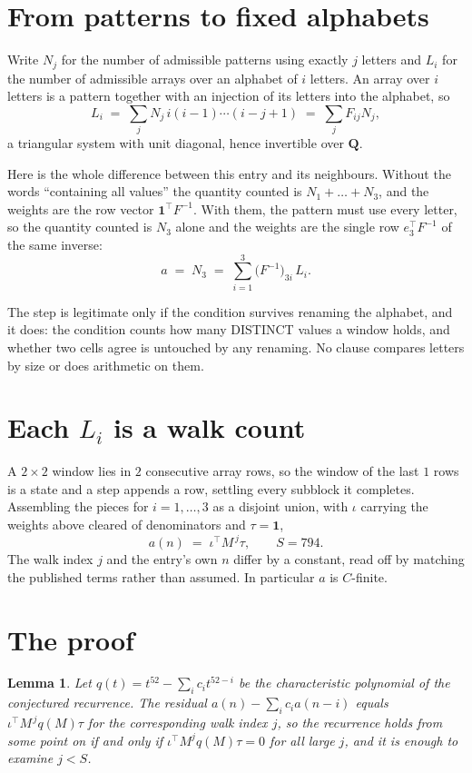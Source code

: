 \documentclass[11pt,a4paper]{article}
\theoremstyle{plain}
\newtheorem{lemma}[theorem]{Lemma}
\theoremstyle{definition}
\begin{document}
\section{From patterns to fixed alphabets}

Write $N_j$ for the number of admissible patterns using exactly $j$ letters and $L_i$ for the
number of admissible arrays over an alphabet of $i$ letters. An array over $i$ letters is a
pattern together with an injection of its letters into the alphabet, so
\[
L_i\;=\;\sum_{j} N_j\,i(i-1)\cdots(i-j+1)\;=\;\sum_j F_{ij}N_j ,
\]
a triangular system with unit diagonal, hence invertible over $\mathbf{Q}$.

Here is the whole difference between this entry and its neighbours. Without the words
``containing all values'' the quantity counted is $N_1+\dots+N_{3}$, and the weights are
the row vector $\mathbf{1}^{\!\top}F^{-1}$. With them, the pattern must use every letter,
so the quantity counted is $N_{3}$ alone and the weights are the single row
$e_{3}^{\!\top}F^{-1}$ of the same inverse:
\[
a\;=\;N_{3}\;=\;\sum_{i=1}^{3}\bigl(F^{-1}\bigr)_{3i}\,L_i .
\]

The step is legitimate only if the condition survives renaming the alphabet, and it does: the
condition counts how many DISTINCT values a window holds, and whether two cells agree is
untouched by any renaming. No clause compares letters by size or does arithmetic on them.

\section{Each $L_i$ is a walk count}

A $2\times2$ window lies in $2$ consecutive array rows, so the window of the last
$1$ rows is a state and a step appends a row, settling every subblock it completes.
Assembling the pieces for $i=1,\dots,3$ as a disjoint union, with $\iota$ carrying the
weights above cleared of denominators and $\tau=\mathbf{1}$,
\[
a(n)\;=\;\iota^{\!\top}M^{\,j}\tau ,\qquad S=794.
\]
The walk index $j$ and the entry's own $n$ differ by a constant, read off by matching the
published terms rather than assumed. In particular $a$ is $C$-finite.

\section{The proof}

\begin{lemma}\label{lem:crit}
Let $q(t)=t^{52}-\sum_i c_it^{52-i}$ be the characteristic polynomial of the
conjectured recurrence. The residual $a(n)-\sum_ic_ia(n-i)$ equals
$\iota^{\!\top}M^{\,j}q(M)\tau$ for the corresponding walk index $j$, so the recurrence
holds from some point on if and only if $\iota^{\!\top}M^{j}q(M)\tau=0$ for all large $j$,
and it is enough to examine $j<S$.
\end{lemma}
\end{document}
